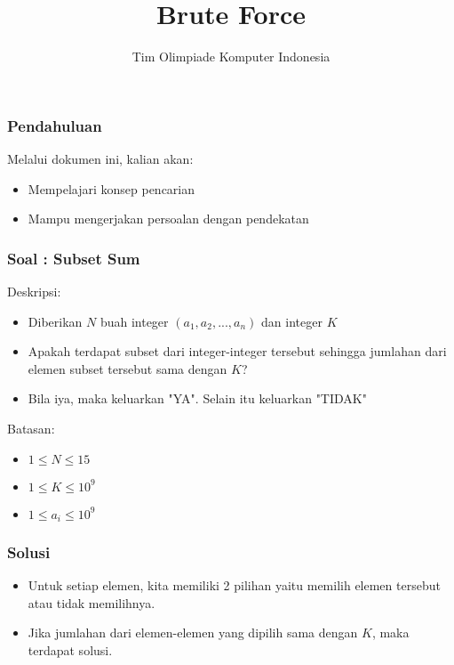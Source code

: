 

\title{Brute Force}
\author{Tim Olimpiade Komputer Indonesia}
\date{}



\begin{frame}
\titlepage
\end{frame}

\begin{frame}
\frametitle{Pendahuluan}
Melalui dokumen ini, kalian akan:
\begin{itemize}
  \item Mempelajari konsep pencarian 
  \item Mampu mengerjakan persoalan dengan pendekatan 
\end{itemize}

\end{frame}

\begin{frame}
\frametitle{Soal : Subset Sum}
Deskripsi:
\begin{itemize}
  \item Diberikan $N$ buah integer $(a_1, a_2, ..., a_n)$ dan integer $K$
  \item Apakah terdapat subset dari integer-integer tersebut sehingga jumlahan dari elemen subset tersebut sama dengan $K$? 
  \item Bila iya, maka keluarkan "YA". Selain itu keluarkan "TIDAK"
\end{itemize}

Batasan:
\begin{itemize} 
  \item $1 \leq N \leq 15$
  \item $1 \leq K \leq 10^9$
  \item $1 \leq a_i \leq 10^9$
\end{itemize}

\end{frame}

\begin{frame}
\frametitle{Solusi}
\begin{itemize}
  \item Untuk setiap elemen, kita memiliki 2 pilihan yaitu memilih elemen tersebut atau tidak memilihnya.
  \item Jika jumlahan dari elemen-elemen yang dipilih sama dengan $K$, maka terdapat solusi.
\end{itemize}
\end{frame}

